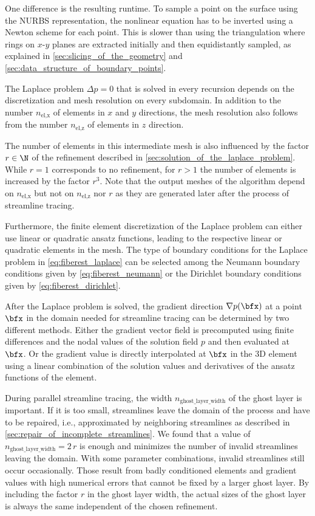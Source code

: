 One difference is the resulting runtime. To sample a point on the surface using the NURBS representation, the nonlinear equation has to be inverted using a Newton scheme for each point. This is slower than using the triangulation where rings on $x$-$y$ planes are extracted initially and then equidistantly sampled, as explained in \cref{sec:slicing_of_the_geometry} and \cref{sec:data_structure_of_boundary_points}.

The Laplace problem $Δp=0$ that is solved in every recursion depends on the discretization and mesh resolution on every subdomain.
In addition to the number $n_\text{el,x}$ of elements in $x$ and $y$ directions, the mesh resolution also follows from the number $n_\text{el,z}$ of elements in $z$ direction.

The number of elements in this intermediate mesh is also influenced by the factor $r\in \N$ of the refinement described in \cref{sec:solution_of_the_laplace_problem}. While $r=1$ corresponds to no refinement, for $r>1$ the number of elements is increased by the factor $r^3$.
Note that the output meshes of the algorithm depend on $n_\text{el,x}$ but not on $n_\text{el,z}$ nor $r$ as they are generated later after the process of streamline tracing.

Furthermore, the finite element discretization of the Laplace problem can either use linear or quadratic ansatz functions, leading to the respective linear or quadratic elements in the mesh.
The type of boundary conditions for the Laplace problem in \cref{eq:fiberest_laplace} can be selected among the Neumann boundary conditions given by \cref{eq:fiberest_neumann} or the Dirichlet boundary conditions given by \cref{eq:fiberest_dirichlet}.

After the Laplace problem is solved, the gradient direction $\nabla p(\bfx)$ at a point $\bfx$ in the domain needed for streamline tracing can be determined by two different methods.
Either the gradient vector field is precomputed using finite differences and the nodal values of the solution field $p$ and then evaluated at $\bfx$.
Or the gradient value is directly interpolated at $\bfx$ in the 3D element using a linear combination of the solution values and derivatives of the ansatz functions of the element.

During parallel streamline tracing, the width $n_\text{ghost\_layer\_width}$ of the ghost layer is important. If it is too small, streamlines leave the domain of the process and have to be repaired, i.e., approximated by neighboring streamlines as described in \cref{sec:repair_of_incomplete_streamlines}. We found that a value of $n_\text{ghost\_layer\_width}=2\,r$ is enough and minimizes the number of invalid streamlines leaving the domain. With some parameter combinations, invalid streamlines still occur occasionally. Those result from badly conditioned elements and gradient values with high numerical errors that cannot be fixed by a larger ghost layer.
By including the factor $r$ in the ghost layer width, the actual sizes of the ghost layer is always the same independent of the chosen refinement.

